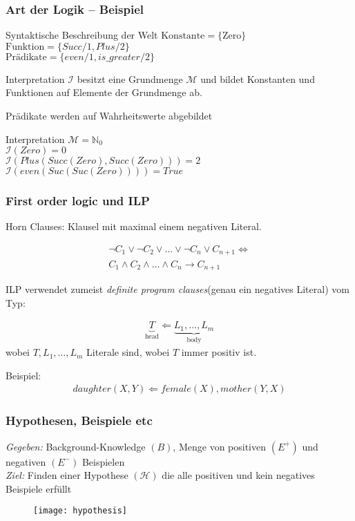 \begin{frame}
	\frametitle{Art der Logik -- Beispiel}

	\begin{block}{Syntaktische Beschreibung der Welt}
		$\text{Konstante} = \{\text{Zero}\}$\\
		$\text{Funktion} =\{Succ/1, Plus/2 \}$\\
		$\text{Prädikate} =\{even/1, is\_greater/2 \}$
	\end{block}

	Interpretation $\mathcal{I}$ besitzt eine Grundmenge $\mathcal{M}$
	und bildet Konstanten und Funktionen auf Elemente der Grundmenge ab.

	Prädikate werden auf Wahrheitswerte abgebildet

	\begin{block}{Interpretation}
			$\mathcal{M} = \mathbb{N}_0$\\
			$\mathcal{I}(Zero) = 0$\\
			$\mathcal{I}(Plus(Succ(Zero), Succ(Zero))) = 2$\\
			$\mathcal{I}(even(Suc(Suc(Zero)))) = True$
	\end{block}
	
\end{frame}

\begin{frame}
	\frametitle{First order logic und ILP}
	Horn Clauses: Klausel mit maximal einem negativen Literal.

	\begin{align*}
		\neg C_1 \vee \neg C_2 \vee \ldots \vee \neg C_n  \vee C_{n+1} \Leftrightarrow\\
		C_1 \wedge C_2 \wedge \ldots \wedge C_n  \rightarrow C_{n+1}
	\end{align*}

	ILP verwendet zumeist \textit{definite program clauses}(genau ein negatives Literal) vom Typ:

	\begin{align*}
		\underbrace{T}_{\text{head}} \Leftarrow \underbrace{L_1, \ldots, L_m}_{\text{body}}
	\end{align*}
	wobei $T, L_1, \ldots, L_m$ Literale sind, wobei $T$ immer positiv ist.

	Beispiel:
	\begin{align*}
		daughter(X,Y) \Leftarrow female(X), mother(Y, X)
	\end{align*}
\end{frame}


\begin{frame}
\frametitle{Hypothesen, Beispiele etc}
	\emph{Gegeben:} Background-Knowledge $(B)$, Menge von positiven $(E^+)$ und negativen $(E^-)$ Beispielen\\
	\emph{Ziel:} Finden einer Hypothese $(\mathcal{H})$ die alle positiven und kein negatives Beispiele erfüllt
\begin{figure}[H]
	\centering
	\texttt{[image: hypothesis]}
\end{figure}
\end{frame}
